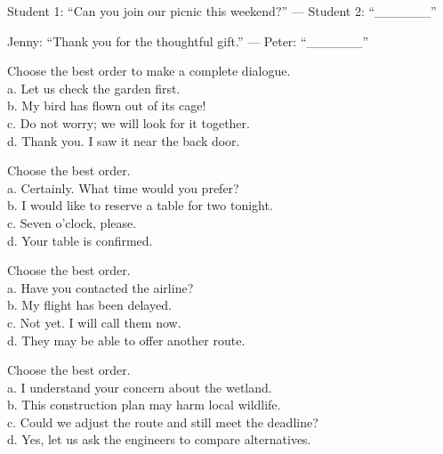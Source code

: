 \begin{ex}
Student 1: “Can you join our picnic this weekend?” — Student 2: “______”
\end{ex}

\begin{ex}
Jenny: “Thank you for the thoughtful gift.” — Peter: “______”
\end{ex}

\begin{ex}
Choose the best order to make a complete dialogue.\\
a. Let us check the garden first.\\
b. My bird has flown out of its cage!\\
c. Do not worry; we will look for it together.\\
d. Thank you. I saw it near the back door.
\end{ex}

\begin{ex}
Choose the best order.\\
a. Certainly. What time would you prefer?\\
b. I would like to reserve a table for two tonight.\\
c. Seven o'clock, please.\\
d. Your table is confirmed.
\end{ex}

\begin{ex}
Choose the best order.\\
a. Have you contacted the airline?\\
b. My flight has been delayed.\\
c. Not yet. I will call them now.\\
d. They may be able to offer another route.
\end{ex}

\begin{ex}
Choose the best order.\\
a. I understand your concern about the wetland.\\
b. This construction plan may harm local wildlife.\\
c. Could we adjust the route and still meet the deadline?\\
d. Yes, let us ask the engineers to compare alternatives.
\end{ex}

